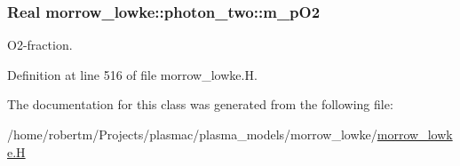\subsubsection[{\texorpdfstring{m\+\_\+p\+O2}{m_pO2}}]{\setlength{\rightskip}{0pt plus 5cm}Real morrow\+\_\+lowke\+::photon\+\_\+two\+::m\+\_\+p\+O2\hspace{0.3cm}{\ttfamily [protected]}}\hypertarget{classmorrow__lowke_1_1photon__two_a84790a6fc961c163a3e71362033dd6cd}{}\label{classmorrow__lowke_1_1photon__two_a84790a6fc961c163a3e71362033dd6cd}


O2-\/fraction. 



Definition at line 516 of file morrow\+\_\+lowke.\+H.



The documentation for this class was generated from the following file\+:\begin{DoxyCompactItemize}
\item 
/home/robertm/\+Projects/plasmac/plasma\+\_\+models/morrow\+\_\+lowke/\hyperlink{morrow__lowke_8H}{morrow\+\_\+lowke.\+H}\end{DoxyCompactItemize}
